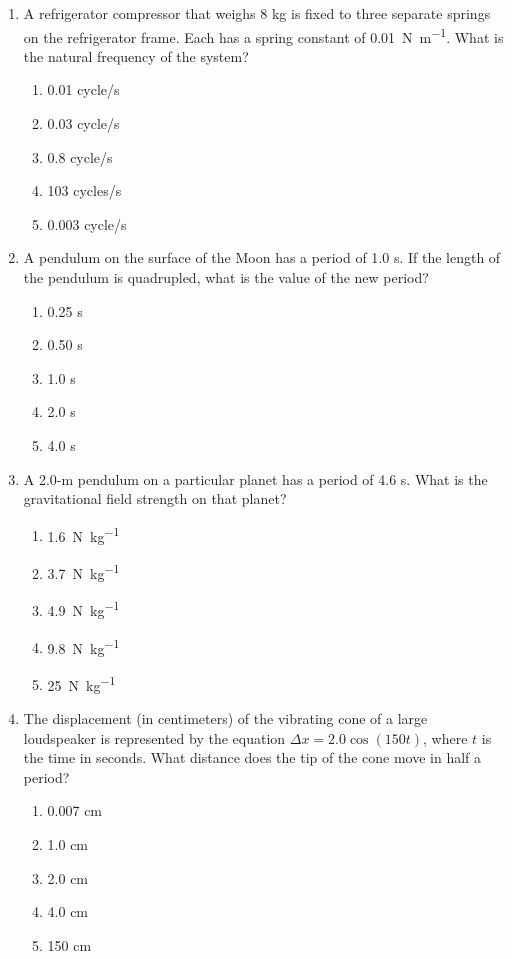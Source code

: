 \documentclass{../../../oss-classkick}
\begin{document}
\begin{multicols}{2}
\begin{enumerate}[leftmargin=18pt]
  \item A refrigerator compressor that weighs 8 kg is fixed to three separate
    springs on the refrigerator frame. Each has a spring constant of
    \SI{0.01}{\newton\per\metre}. What is the natural frequency of the system?
    \begin{enumerate}[nosep,leftmargin=18pt,label=(\Alph*)]
    \item 0.01 cycle/s
    \item 0.03 cycle/s
    \item 0.8 cycle/s
    \item 103 cycles/s
    \item 0.003 cycle/s
    \end{enumerate}
    \vspace{.7in}
    
  \item A pendulum on the surface of the Moon has a period of 1.0 s. If the
    length of the pendulum is quadrupled, what is the value of the new
    period?
    \begin{enumerate}[nosep,leftmargin=18pt,label=(\Alph*)]
    \item 0.25 s
    \item 0.50 s
    \item 1.0 s
    \item 2.0 s
    \item 4.0 s
    \end{enumerate}
    
  \item A 2.0-m pendulum on a particular planet has a period of 4.6 s. What is
    the gravitational field strength on that planet?
    \begin{enumerate}[nosep,leftmargin=18pt,label=(\Alph*)]
    \item\SI{1.6}{\newton\per\kilo\gram}
    \item\SI{3.7}{\newton\per\kilo\gram}
    \item\SI{4.9}{\newton\per\kilo\gram}
    \item\SI{9.8}{\newton\per\kilo\gram}
    \item\SI{25}{\newton\per\kilo\gram}
    \end{enumerate}

  \item The displacement (in centimeters) of the vibrating cone of a large
    loudspeaker is represented by the equation $\Delta x=2.0\cos(150t)$, where
    $t$ is the time in seconds. What distance does the tip of the cone move in
    half a period?
    \begin{enumerate}[nosep,leftmargin=18pt,label=(\Alph*)]
    \item 0.007 cm
    \item 1.0 cm
    \item 2.0 cm
    \item 4.0 cm
    \item 150 cm
    \end{enumerate}


\end{enumerate}
\end{multicols}
\end{document}
